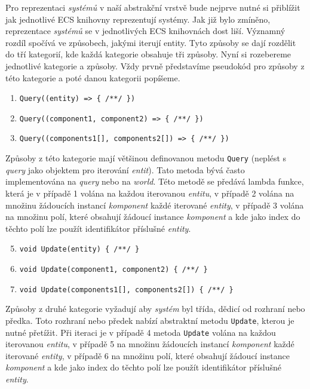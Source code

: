 Pro reprezentaci \textit{systémů} v naší abstrakční vrstvě bude nejprve nutné si přiblížit jak jednotlivé ECS knihovny reprezentují systémy. Jak již bylo zmíněno, reprezentace \textit{systémů} se v jednotlivých ECS knihovnách dost liší. Významný rozdíl spočívá ve způsobech, jakými iterují entity. Tyto způsoby se dají rozdělit do tří kategorií, kde každá kategorie obsahuje tři způsoby. Nyní si rozebereme jednotlivé kategorie a způsoby. Vždy prvně představíme pseudokód pro způsoby z této kategorie a poté danou kategorii popíšeme.

\begin{enumerate}
    \item \verb|Query((entity) => { /**/ })|
    \item \verb|Query((component1, component2) => { /**/ })|
    \item \verb|Query((components1[], components2[]) => { /**/ })|
\end{enumerate}

Způsoby z této kategorie mají většinou definovanou metodu \verb|Query| (neplést s \textit{query} jako objektem pro iterování \textit{entit}). Tato metoda bývá často implementována na \textit{query} nebo na \textit{world}. Této metodě se předává lambda funkce, která je v případě 1 volána na každou iterovanou \textit{entitu}, v případě 2 volána na množinu žádoucích instancí \textit{komponent} každé iterované \textit{entity}, v případě 3 volána na množinu polí, které obsahují žádoucí instance \textit{komponent} a kde jako index do těchto polí lze použít identifikátor příslušné \textit{entity}.

\begin{enumerate}
    \setcounter{enumi}{4}
    \item \verb|void Update(entity) { /**/ }|
    \item \verb|void Update(component1, component2) { /**/ }|
    \item \verb|void Update(components1[], components2[]) { /**/ }|
\end{enumerate}

Způsoby z druhé kategorie vyžadují aby \textit{systém} byl třída, dědicí od rozhraní nebo předka. Toto rozhraní nebo předek nabízí abstraktní metodu \verb|Update|, kterou je nutné přetížit. Při iteraci je v případě 4 metoda \verb|Update| volána na každou iterovanou \textit{entitu}, v případě 5 na množinu žádoucích instancí \textit{komponent} každé iterované \textit{entity}, v případě 6 na množinu polí, které obsahují žádoucí instance \textit{komponent} a kde jako index do těchto polí lze použít identifikátor příslušné \textit{entity}.

